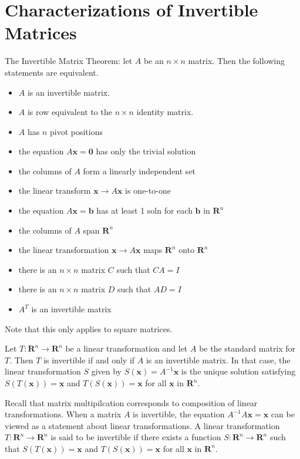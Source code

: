 \documentclass[../linalg.tex]{subfiles}
\begin{document}
\section{Characterizations of Invertible Matrices}
The Invertible Matrix Theorem: let $A$ be an $n\times n$ matrix. Then the following statements are equivalent.
\begin{itemize}
    \item $A$ is an invertible matrix.
    \item $A$ is row equivalent to the $n\times n$ identity matrix.
    \item $A$ has $n$ pivot positions 
    \item the equation $A\textbf{x}=\textbf{0}$ has only the trivial solution 
    \item the columns of $A$ form a linearly independent set 
    \item the linear transform $\textbf{x}\rightarrow A\textbf{x}$ is one-to-one 
    \item the equation $A\textbf{x}=\textbf{b}$ has at least 1 soln for each $\textbf{b}$ in $\textbf{R}^n$
    \item the columns of $A$ span $\textbf{R}^n$
    \item the linear transformation $\textbf{x}\rightarrow A\textbf{x}$ maps $\textbf{R}^n$ onto $\textbf{R}^n$
    \item there is an $n\times n$ matrix $C$ such that $CA=I$
    \item there is an $n\times n$ matrix $D$ such that $AD=I$
    \item $A^T$ is an invertible matrix 
\end{itemize}
Note that this only applies to square matrices.

\begin{theorem}
    Let $T:\textbf{R}^n\rightarrow \textbf{R}^n$ be a linear transformation and let $A$ be the standard matrix for $T$. Then $T$ is invertible if and only if $A$ is an invertible matrix.
    In that case, the linear transformation $S$ given by $S(\textbf{x})=A^{-1}\textbf{x}$ is the unique solution satisfying $S(T(\textbf{x}))=\textbf{x}$ and $T(S(\textbf{x}))=\textbf{x}$ for all $\textbf{x}$ in $\textbf{R}^n$.
\end{theorem}

Recall that matrix multipilcation corresponds to composition of linear transformations. When a matrix $A$ is invertible, the equation $A^{-1}A\textbf{x}=\textbf{x}$ can be viewed as a statement 
about linear transformations. A linear transformation $T:\textbf{R}^n\rightarrow \textbf{R}^n$ is said to be invertible if there exists a function $S:\textbf{R}^n\rightarrow \textbf{R}^n$ such that $S(T(\textbf{x}))=\textbf{x}$ and $T(S(\textbf{x}))=\textbf{x}$ for all $\textbf{x}$ in $\textbf{R}^n$.
\end{document}
